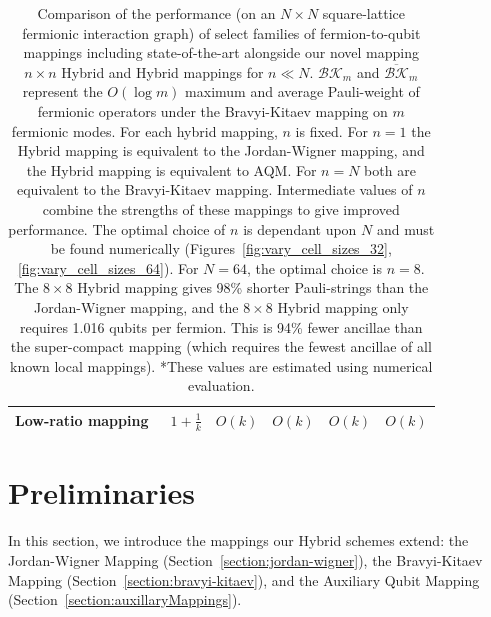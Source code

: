 \documentclass[pdftex,pra,aps,twocolumn,twoside]{revtex4-2}
\theoremstyle{plain}
\theoremstyle{note}
\newcommand\+{{\footnotesize \raisebox{0.3ex}{+}}}
\begin{document}
\begin{table}
\begin{tabular}{k{6em} k{4.3em} k{4.5em} k{4.6em} k{5em} k{4.6em}}
        Low-ratio mapping~\cite{chen2022equivalence,steudtner2019quantum}&$1+\frac{1}{k}$&$O(k)$&$O(k)$&$O(k)$& $O(k)$\\ \hline
    \end{tabular}
    \caption{\label{tab:performance} { Comparison of the performance (on an $N \times N$ square-lattice fermionic interaction graph) of select families of fermion-to-qubit mappings including state-of-the-art alongside our novel mapping $n\times n$ Hybrid and Hybrid\+ mappings for $n \ll N$.  $\mathcal{BK}_m$ and $\overline{\mathcal{BK}}_m$ represent the $O(\log m)$ maximum and average Pauli-weight of fermionic operators under the Bravyi-Kitaev mapping on $m$ fermionic modes. For each hybrid mapping, $n$ is fixed. For $n=1$ the Hybrid mapping is equivalent to the Jordan-Wigner mapping, and the Hybrid\+ mapping is equivalent to AQM. For $n=N$ both are equivalent to the Bravyi-Kitaev mapping. Intermediate values of $n$ combine the strengths of these mappings to give improved performance. The optimal choice of $n$ is dependant upon $N$ and must be found numerically (Figures~\ref{fig:vary_cell_sizes_32},\ref{fig:vary_cell_sizes_64}). For $N=64$, the optimal choice is $n=8$. The $8 \times 8$ Hybrid mapping gives 98\% shorter Pauli-strings than the Jordan-Wigner mapping, and the $8 \times 8$ Hybrid\+ mapping only requires 1.016 qubits per fermion. This is 94\% fewer ancillae than the super-compact mapping (which requires the fewest ancillae of all known local mappings). *These values are estimated using numerical evaluation.} } 
\end{table}
\section{Preliminaries}
 In this section, we introduce the mappings our Hybrid schemes extend: the Jordan-Wigner Mapping (Section~\ref{section:jordan-wigner}), the Bravyi-Kitaev Mapping (Section~\ref{section:bravyi-kitaev}), and the Auxiliary Qubit Mapping (Section~\ref{section:auxillaryMappings}).
\end{document}
